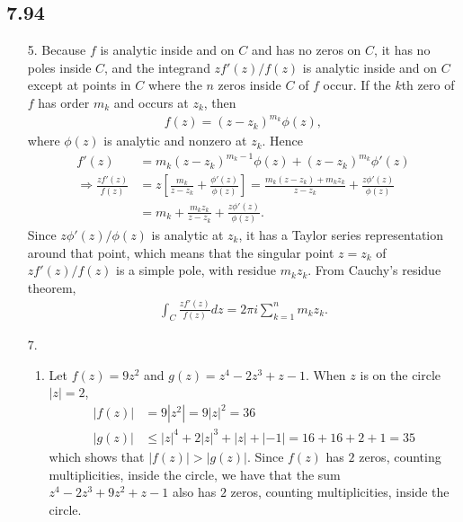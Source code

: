 \documentclass[a4paper,12pt]{article}
\begin{document}
\subsection*{7.94}
\begin{enumerate}
    \item[5.]
        Because $f$ is analytic inside and on $C$ and has no zeros on $C$, it has no poles inside $C$, and the integrand $zf'(z)/f(z)$ is analytic inside and on $C$ except at points in $C$ where the $n$ zeros inside $C$ of $f$ occur. If the $k$th zero of $f$ has order $m_k$ and occurs at $z_k$, then
        \begin{align*}
            f(z) = (z - z_k)^{m_k} \phi(z),
        \end{align*}
        where $\phi(z)$ is analytic and nonzero at $z_k$. Hence
        \begin{align*}
            f'(z) &= m_k(z - z_k)^{m_k - 1} \phi(z) + (z - z_k)^{m_k} \phi'(z) \\
            \Rightarrow \frac{zf'(z)}{f(z)} &= z \left[ \frac{m_k}{z - z_k} + \frac{\phi'(z)}{\phi(z)} \right] = \frac{m_k(z - z_k) + m_k z_k}{z - z_k} + \frac{z\phi'(z)}{\phi(z)} \\
            &= m_k + \frac{m_k z_k}{z - z_k} + \frac{z \phi'(z)}{\phi(z)}.
        \end{align*}
        Since $z\phi'(z)/\phi(z)$ is analytic at $z_k$, it has a Taylor series representation around that point, which means that the singular point $z = z_k$ of $zf'(z)/f(z)$ is a simple pole, with residue $m_k z_k$. From Cauchy's residue theorem,
        \begin{align*}
            \int_C \frac{zf'(z)}{f(z)} dz = 2\pi i \sum_{k = 1}^n m_k z_k.
        \end{align*}

    \item[7.]
        \begin{enumerate}
            \item
                Let $f(z) = 9z^2$ and $g(z) = z^4 - 2z^3 + z - 1$. When $z$ is on the circle $|z| = 2$,
                \begin{align*}
                    |f(z)| &= 9|z^2| = 9|z|^2 = 36 \\
                    |g(z)| &\leq |z|^4 + 2|z|^3 + |z| + |{-1}| = 16 + 16 + 2 + 1 = 35
                \end{align*}
                which shows that $|f(z)| > |g(z)|$. Since $f(z)$ has $2$ zeros, counting multiplicities, inside the circle, we have that the sum $z^4 - 2z^3 + 9z^2 + z - 1$ also has $2$ zeros, counting multiplicities, inside the circle.


\end{enumerate}
\end{enumerate}
\end{document}
